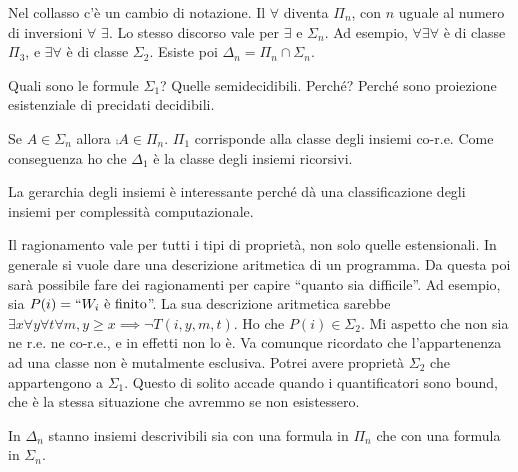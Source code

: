 Nel collasso c'è un cambio di notazione. Il $\forall$ diventa $\Pi_{n}$, con $n$ uguale al numero di
inversioni $\forall$ $\exists$. Lo stesso discorso vale per $\exists$ e $\Sigma_{n}$. Ad esempio,
$\forall \exists \forall$ è di classe $\Pi_{3}$, e $\exists \forall$ è di classe $\Sigma_{2}$. Esiste poi
$\Delta_{n} = \Pi_{n} \cap \Sigma_{n}$.

Quali sono le formule $\Sigma_{1}$? Quelle semidecidibili. Perché? Perché sono proiezione
esistenziale di precidati decidibili.

Se $A \in \Sigma_{n}$ allora $\comp{A} \in \Pi_{n}$. $\Pi_{1}$ corrisponde alla classe degli insiemi
co-r.e. Come conseguenza ho che $\Delta_{1}$ è la classe degli insiemi ricorsivi.

La gerarchia degli insiemi è interessante perché dà una classificazione degli insiemi per
complessità computazionale.

Il ragionamento vale per tutti i tipi di proprietà, non solo quelle estensionali. In generale si
vuole dare una descrizione aritmetica di un programma. Da questa poi sarà possibile fare dei
ragionamenti per capire ``quanto sia difficile''. Ad esempio, sia $P(i) = ``W_{i} \text{ è
finito}$''. La sua
descrizione aritmetica sarebbe $\exists x \forall y \forall t \forall m, y \geq x \implies \lnot
T(i,y,m,t)$. Ho che $P(i) \in \Sigma_{2}$. Mi aspetto che non sia ne r.e. ne co-r.e., e in effetti non
lo è. Va comunque ricordato che l'appartenenza ad una classe non è mutalmente esclusiva. Potrei
avere proprietà $\Sigma_{2}$ che appartengono a $\Sigma_{1}$. Questo di solito accade quando i
quantificatori sono bound, che è la stessa situazione che avremmo se non esistessero.

In $\Delta_{n}$ stanno insiemi descrivibili sia con una formula in $\Pi_{n}$ che con una formula in
$\Sigma_{n}$.
